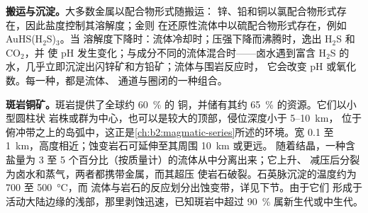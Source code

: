 \textbf{搬运与沉淀。}大多数金属以配合物形式随搬运：
锌、铅和铜以氯配合物形式存在，因此盐度控制其溶解度；金则
在还原性流体中以硫配合物形式存在，例如 AuHS(H$_2$S)$_3$。当
溶解度下降时：流体冷却时；压强下降而沸腾时，逸出 H$_2$S 和 CO$_2$，并
使 pH 发生变化；与成分不同的流体混合时——卤水遇到富含
H$_2$S 的水，几乎立即沉淀出闪锌矿和方铅矿；流体与围岩反应时，
它会改变 pH 或氧化数。每一种，都是流体、
通道与圈闭的一种组合。

\textbf{斑岩铜矿。}斑岩提供了全球约 \qty{60}{\percent} 的
铜，并储有其约 \qty{65}{\percent} 的资源。它们以小型圆柱状
岩株或群为中心，也可以是较大的顶部，侵位深度小于 5--\qty{10}{km}，
位于俯冲带之上的岛弧中，这正是\cref{ch:b2:magmatic-series}所述的环境。宽 0.1 至
\qty{1}{km}，高度相近；蚀变岩石可延伸至其周围 \qty{10}{km} 或更远。
随着结晶，一种含盐量为 3 至 5 个百分比（按质量计）的流体从中分离出来；它上升、
减压后分裂为卤水和蒸气，两者都携带金属，而其超压
使岩石破裂。石英脉沉淀的温度约为 700 至 \qty{500}{\celsius}，而
流体与岩石的反应划分出蚀变带，详见下节。由于它们
形成于活动大陆边缘的浅部，那里剥蚀迅速，已知斑岩中超过 \qty{90}{\percent}
属新生代或中生代。

